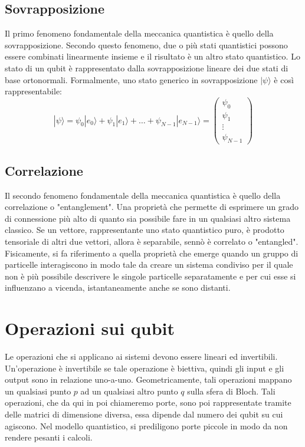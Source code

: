 \subsection{Sovrapposizione}
Il primo fenomeno fondamentale della meccanica quantistica è quello della sovrapposizione. Secondo questo fenomeno, due o più stati quantistici possono essere combinati linearmente insieme e il risultato è un altro stato quantistico. Lo stato di un qubit è rappresentato dalla sovrapposizione lineare dei due stati di base ortonormali. Formalmente, uno stato generico in sovrapposizione $|\psi\rangle$ è così rappresentabile:
\begin{equation}
  |\psi\rangle = \psi_0 |e_0\rangle + \psi_1 |e_1\rangle + \dots + \psi_{N-1} |e_{N-1}\rangle = \begin{pmatrix} \psi_0\\\psi_1\\\vdots\\\psi_{N - 1} \end{pmatrix}
\end{equation}
\subsection{Correlazione}
Il secondo fenomeno fondamentale della meccanica quantistica è quello della correlazione o "entanglement". Una proprietà che permette di esprimere un grado di connessione più alto di quanto sia possibile fare in un qualsiasi altro sistema classico. Se un vettore, rappresentante uno stato quantistico puro, è prodotto tensoriale di altri due vettori, allora è separabile, sennò è correlato o "entangled". Fisicamente, si fa riferimento a quella proprietà che emerge quando un gruppo di particelle interagiscono in modo tale da creare un sistema condiviso per il quale non è più possibile descrivere le singole particelle separatamente e per cui esse si influenzano a vicenda, istantaneamente anche se sono distanti.

\section{Operazioni sui qubit \label{sec:operazioni}}
Le operazioni che si applicano ai sistemi devono essere lineari ed invertibili. Un'operazione è invertibile se tale operazione è biettiva, quindi gli input e gli output sono in relazione uno-a-uno. Geometricamente, tali operazioni mappano un qualsiasi punto $p$ ad un qualsiasi altro punto $q$ sulla sfera di Bloch. Tali operazioni, che da qui in poi chiameremo porte, sono poi rappresentate tramite delle matrici di dimensione diversa, essa dipende dal numero dei qubit su cui agiscono. Nel modello quantistico, si prediligono porte piccole in modo da non rendere pesanti i calcoli.
